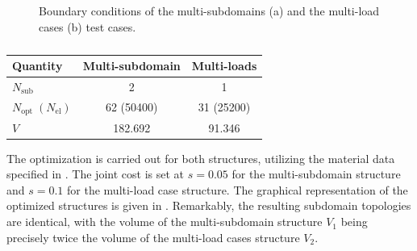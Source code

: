 \begin{figure}[]
    \hspace*{\fill}
    \hfill
    \hspace*{\fill}
    \caption{Boundary conditions of the multi-subdomains (a) and the multi-load cases (b) test cases.}
    \label{fig:05_cell_multi_eq_bcs}
\end{figure}

\begin{table}
    \centering
    \small
    \begin{tabular}{lcc}
        \toprule
        \textbf{Quantity} & Multi-subdomain & Multi-loads \\ \midrule
    $N_\text{sub}$       &2& 1   \\
    $N_\text{opt}\;(N_\text{el})$ & 62 (50400)&31 (25200)  \\
    $V$ &  182.692 & 91.346 \\ \bottomrule
    \end{tabular}
    \caption{}
    \label{tab:05_}
    \end{table}

The optimization is carried out for both structures, utilizing the material data specified in . The joint cost is set at $s = 0.05$ for the multi-subdomain structure and $s = 0.1$ for the multi-load case structure. The graphical representation of the optimized structures is given in . Remarkably, the resulting subdomain topologies are identical, with the volume of the multi-subdomain structure $V_1$ being precisely twice the volume of the multi-load cases structure $V_2$. 

